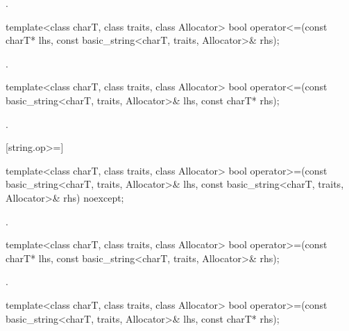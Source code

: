 \begin{itemdescr}
\pnum
\returns
{}.
\end{itemdescr}

%
\begin{itemdecl}
template<class charT, class traits, class Allocator>
  bool operator<=(const charT* lhs, const basic_string<charT, traits, Allocator>& rhs);
\end{itemdecl}

\begin{itemdescr}
\pnum
\returns
{}.
\end{itemdescr}

%
\begin{itemdecl}
template<class charT, class traits, class Allocator>
  bool operator<=(const basic_string<charT, traits, Allocator>& lhs, const charT* rhs);
\end{itemdecl}

\begin{itemdescr}
\pnum
\returns
{}.
\end{itemdescr}

[string.op>=]{}

%
\begin{itemdecl}
template<class charT, class traits, class Allocator>
  bool operator>=(const basic_string<charT, traits, Allocator>& lhs,
                  const basic_string<charT, traits, Allocator>& rhs) noexcept;
\end{itemdecl}

\begin{itemdescr}
\pnum
\returns
{}.
\end{itemdescr}

%
\begin{itemdecl}
template<class charT, class traits, class Allocator>
  bool operator>=(const charT* lhs, const basic_string<charT, traits, Allocator>& rhs);
\end{itemdecl}

\begin{itemdescr}
\pnum
\returns
{}.
\end{itemdescr}

%
\begin{itemdecl}
template<class charT, class traits, class Allocator>
  bool operator>=(const basic_string<charT, traits, Allocator>& lhs, const charT* rhs);
\end{itemdecl}

